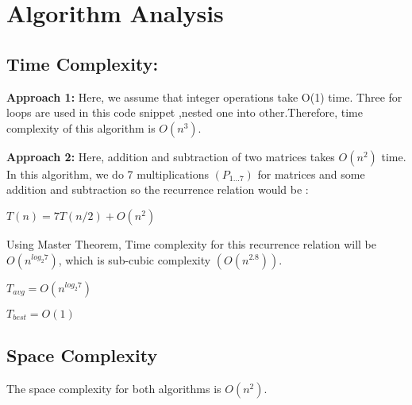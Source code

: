 \documentclass[conference]{IEEEtran}
\begin{document}
\section{Algorithm Analysis}
\subsection{Time Complexity:}

\textbf{Approach 1:} 
Here, we assume that integer operations take O(1) time. Three for loops are used in this code snippet ,nested one into other.Therefore, time complexity of this algorithm is $O(n^3)$.


\textbf{Approach 2:} 
Here, addition and subtraction of two matrices takes $O(n^2)$ time.
In this algorithm, we do 7 multiplications $(P_{1\dots7})$ for matrices and some addition and subtraction so the recurrence relation would be :

$T(n)=7T(n/2)+ O(n^2)$

Using Master Theorem, Time complexity for this recurrence relation will be $O(n^{log_2{7}})$, which is sub-cubic complexity $(O(n^{2.8}))$.

$T_{avg} = O(n^{log_2{7}})$

$T_{best} = O(1)$

\subsection{Space Complexity}
The space complexity for both algorithms is $O(n^2)$.
\end{document}
